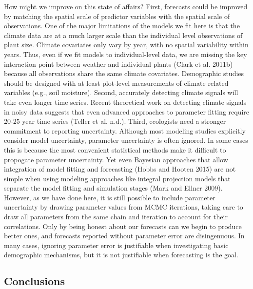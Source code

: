 \documentclass[12pt,]{article}
\begin{document}
How might we improve on this state of affairs? First, forecasts could be
improved by matching the spatial scale of predictor variables with the
spatial scale of observations. One of the major limitations of the
models we fit here is that the climate data are at a much larger scale
than the individual level observations of plant size. Climate covariates
only vary by year, with no spatial variability within years. Thus, even
if we fit models to individual-level data, we are missing the key
interaction point between weather and individual plants (Clark et al.
2011b) because all observations share the same climate covariates.
Demographic studies should be designed with at least plot-level
measurements of climate related variables (e.g., soil moisture). Second,
accurately detecting climate signals will take even longer time series.
Recent theoretical work on detecting climate signals in noisy data
suggests that even advanced approaches to parameter fitting require
20-25 year time series (Teller et al. n.d.). Third, ecologists need a
stronger commitment to reporting uncertainty. Although most modeling
studies explicitly consider model uncertainty, parameter uncertainty is
often ignored. In some cases this is because the most convenient
statistical methods make it difficult to propogate parameter
uncertainty. Yet even Bayesian approaches that allow integration of
model fitting and forecasting (Hobbs and Hooten 2015) are not simple
when using modeling approaches like integral projection models that
separate the model fitting and simulation stages (Mark and Ellner 2009).
However, as we have done here, it is still possible to include parameter
uncertainty by drawing parameter values from MCMC iterations, taking
care to draw all parameters from the same chain and iteration to account
for their correlations. Only by being honest about our forecasts can we
begin to produce better ones, and forecasts reported without parameter
error are disingenuous. In many cases, ignoring parameter error is
justifiable when investigating basic demographic mechanisms, but it is
not justifiable when forecasting is the goal.

\subsection{Conclusions}\label{conclusions}
\end{document}
